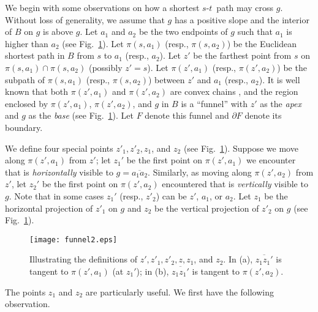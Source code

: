 \documentclass[english,runningheads,11pt]{llncs}
\def\st{$s$-$t$}
\begin{document}
We begin with some
observations on how a shortest \st\ path may cross $g$. Without
loss of generality, we assume that $g$ has a positive slope and
the interior of $B$ on $g$ is above $g$.
Let $a_1$ and $a_2$ be the two endpoints of $g$ such that $a_1$
is higher than $a_2$ (see Fig.~\ref{fig:funnel2}).
Let $\pi(s,a_1)$ (resp., $\pi(s,a_2)$) be the Euclidean shortest path in $B$ from $s$ to
$a_1$ (resp., $a_2$).
Let $z'$ be the farthest point from $s$ on $\pi(s,a_1)\cap \pi(s,a_2)$
(possibly $z'=s$). Let $\pi(z',a_1)$ (resp., $\pi(z',a_2)$)
be the subpath of $\pi(s,a_1)$ (resp., $\pi(s,a_2)$)
between $z'$ and $a_1$ (resp., $a_2$).
It is well known that both $\pi(z',a_1)$ and
$\pi(z',a_2)$ are convex chains \cite{ref:GuibasLi87,ref:LeeEu84}, and
the region enclosed by $\pi(z',a_1)$, $\pi(z',a_2)$, and $g$ in $B$ is a
``funnel'' with $z'$ as the {\em apex} and $g$ as the {\em base} (see
Fig.~\ref{fig:funnel2}).  Let $F$
denote this funnel and $\partial F$ denote its boundary.

We define four special points $z'_1,z'_2,z_1$, and $z_2$ (see Fig.~\ref{fig:funnel2}).
Suppose we move along $\pi(z',a_1)$ from $z'$; let $z_1'$ be the first point on $\pi(z',a_1)$
we encounter that is {\em horizontally} visible to $g=\overline{a_1a_2}$. Similarly, as
moving along $\pi(z',a_2)$ from $z'$, let $z_2'$ be the first point on $\pi(z',a_2)$ encountered
that is {\em vertically} visible to $g$.
Note that in some cases $z_1'$ (resp., $z'_2$) can be $z'$, $a_1$, or $a_2$.
Let $z_1$ be the horizontal projection
of $z'_1$ on $g$ and $z_2$ be the vertical projection of
$z'_2$ on $g$  (see Fig.~\ref{fig:funnel2}).


\begin{figure}[t]
\begin{minipage}[t]{\linewidth}
\begin{center}
\texttt{[image: funnel2.eps]}
\caption{\footnotesize Illustrating the definitions of
$z',z'_1,z'_2,z,z_1$, and $z_2$. In (a), $\overline{z_1z_1'}$ is tangent to $\pi(z',a_1)$ (at $z_1'$); in (b), $\overline{z_1z_1'}$ is tangent to $\pi(z',a_2)$.}
\label{fig:funnel2}
\end{center}
\end{minipage}
\vspace*{-0.15in}
\end{figure}




The points $z_1$ and $z_2$ are particularly useful.
We first have the following observation.
\end{document}
